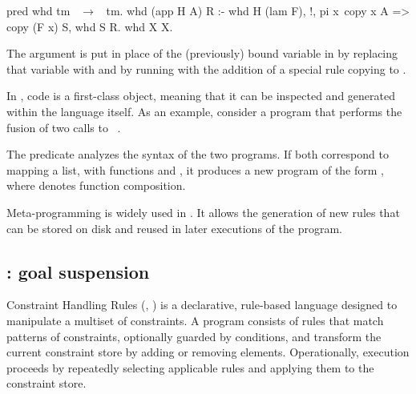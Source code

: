 \begin{elpicode}
pred whd tm ~$\to$~ tm.
whd (app H A) R :- whd H (lam F), !,           %
  pi x\ copy x A => copy (F x) S, whd S R.     %
whd X X.                                       %
\end{elpicode}

The argument  is put in place of the (previously) bound variable in
 by replacing that variable with  and
by running  with the addition of a special rule
copying  to .


In \elpi, code is a first-class object, meaning that it can be inspected and
generated within the language itself. As an example, consider a program that
performs the fusion of two calls to ~\cite{wadler1989}.



The predicate  analyzes the syntax of the two programs. If both correspond to mapping a
list, with functions  and , it produces a new program of the form
, where  denotes function composition.


Meta-programming is widely used in \rocqelpi. It allows the
generation of new rules that can be stored on disk and reused in later
executions of the program.

\subsection{\chr: goal suspension}
\label{sec:chr}

Constraint Handling Rules (\chr, \cite{chr,chr15}) is a declarative,
rule-based language designed to manipulate a multiset of constraints. A
\chr program consists of rules that match patterns of constraints,
optionally guarded by conditions, and transform the current constraint
store by adding or removing elements. Operationally, execution proceeds
by repeatedly selecting applicable rules and applying them to the
constraint store. 

